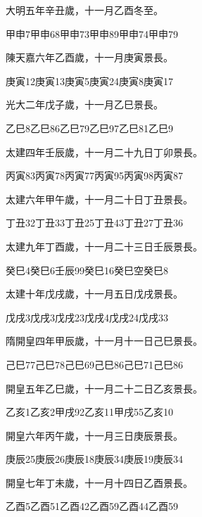 \begin{pinyinscope}
 大明五年辛丑歲，十一月乙酉冬至。



 甲申7甲申68甲申73甲申89甲申74甲申79



 陳天嘉六年乙酉歲，十一月庚寅景長。



 庚寅12庚寅13庚寅5庚寅24庚寅8庚寅17



 光大二年戊子歲，十一月乙巳景長。



 乙巳8乙巳86乙巳79乙巳97乙巳81乙巳9



 太建四年壬辰歲，十一月二十九日丁卯景長。



 丙寅83丙寅78丙寅77丙寅95丙寅98丙寅87



 太建六年甲午歲，十一月二十日丁丑景長。



 丁丑32丁丑33丁丑25丁丑43丁丑27丁丑36



 太建九年丁酉歲，十一月二十三日壬辰景長。



 癸巳4癸巳6壬辰99癸巳16癸巳空癸巳8



 太建十年戊戌歲，十一月五日戊戌景長。



 戊戌3戊戌3戊戌23戊戌4戊戌24戊戌33



 隋開皇四年甲辰歲，十一月十一日己巳景長。



 己巳77己巳78己巳69己巳86己巳71己巳86



 開皇五年乙巳歲，十一月二十二日乙亥景長。



 乙亥1乙亥2甲戌92乙亥11甲戌55乙亥10



 開皇六年丙午歲，十一月三日庚辰景長。



 庚辰25庚辰26庚辰18庚辰34庚辰19庚辰34



 開皇七年丁未歲，十一月十四日乙酉景長。



 乙酉5乙酉51乙酉42乙酉59乙酉44乙酉59




\end{pinyinscope}
